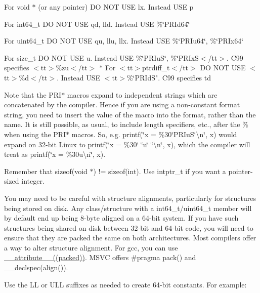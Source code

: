 \begin{DoxyItemize}
\item For {\ttfamily void $\ast$} (or any pointer) DO N\+OT U\+SE {\ttfamily lx}. Instead U\+SE {\ttfamily p}
\item For {\ttfamily int64\+\_\+t} DO N\+OT U\+SE {\ttfamily qd, lld}. Instead U\+SE {\ttfamily \%\char`\"{}\+P\+R\+Id64\char`\"{}}
\item For {\ttfamily uint64\+\_\+t} DO N\+OT U\+SE {\ttfamily qu, llu, llx}. Instead U\+SE {\ttfamily \%\char`\"{}\+P\+R\+Iu64\char`\"{}, \%\char`\"{}\+P\+R\+Ix64\char`\"{}}
\item For {\ttfamily size\+\_\+t} DO N\+OT U\+SE {\ttfamily u}. Instead U\+SE {\ttfamily \%\char`\"{}\+P\+R\+Iu\+S\char`\"{}, \%\char`\"{}\+P\+R\+Ix\+S$<$/tt$>$.  C99 specifies $<$tt$>$\%zu$<$/tt$>$
$\ast$ For $<$tt$>$ptrdiff\+\_\+t$<$/tt$>$ D\+O N\+O\+T U\+S\+E $<$tt$>$\%d$<$/tt$>$. Instead U\+S\+E $<$tt$>$\%\char`\"{}P\+R\+IdS"}. C99 specifies {\ttfamily td}
\end{DoxyItemize}

Note that the {\ttfamily P\+R\+I$\ast$} macros expand to independent strings which are concatenated by the compiler. Hence if you are using a non-\/constant format string, you need to insert the value of the macro into the format, rather than the name. It is still possible, as usual, to include length specifiers, etc., after the \% when using the P\+R\+I$\ast$ macros. So, e.\+g. {\ttfamily printf(\char`\"{}x = \%30\char`\"{}P\+R\+IuS\char`\"{}\textbackslash{}n\char`\"{}, x)} would expand on 32-\/bit Linux to {\ttfamily printf(\char`\"{}x = \%30\char`\"{} \char`\"{}u\char`\"{} \char`\"{}\textbackslash{}n\char`\"{}, x)}, which the compiler will treat as {\ttfamily printf(\char`\"{}x = \%30u\textbackslash{}n\char`\"{}, x)}.


\begin{DoxyItemize}
\item Remember that {\ttfamily sizeof(void $\ast$) != sizeof(int)}. Use {\ttfamily intptr\+\_\+t} if you want a pointer-\/sized integer.
\item You may need to be careful with structure alignments, particularly for structures being stored on disk. Any class/structure with a int64\+\_\+t/uint64\+\_\+t member will by default end up being 8-\/byte aligned on a 64-\/bit system. If you have such structures being shared on disk between 32-\/bit and 64-\/bit code, you will need to ensure that they are packed the same on both architectures. Most compilers offer a way to alter structure alignment. For gcc, you can use {\ttfamily \hyperlink{struct____attribute____}{\+\_\+\+\_\+attribute\+\_\+\+\_\+((packed))}}. M\+S\+VC offers {\ttfamily \#pragma pack()} and {\ttfamily \+\_\+\+\_\+declspec(align())}.
\item Use the {\ttfamily LL} or {\ttfamily U\+LL} suffixes as needed to create 64-\/bit constants. For example\+:
\end{DoxyItemize}


